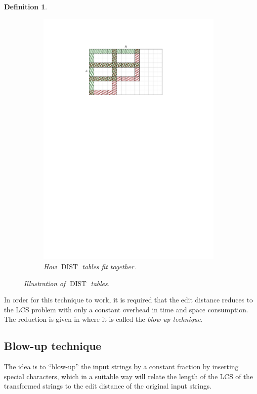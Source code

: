 \documentclass[twoside,11pt,openright]{report}
\newcommand{\DIST}{\operatorname{DIST}}
\newtheorem{mydef}{Definition}
\begin{document}
\begin{mydef}
\begin{figure}[h!]
\begin{subfigure}{0.45\textwidth}
      \includegraphics[width=\textwidth]{images/grid-dist-2}
      \caption{How $\DIST$ tables fit together.}
    \end{subfigure}
    \caption{Illustration of $\DIST$ tables.}
    \label{fig:defn-dist-table}
  \end{figure}
\end{mydef}

In order for this technique to work, it is required that the edit distance reduces to the LCS problem with only a constant overhead in time and space consumption. The reduction is given in \cite[p. 71]{DBLP:journals/corr/abs-0707-3619} where it is called the \textit{blow-up technique}.

\subsection{Blow-up technique}
The idea is to “blow-up” the input strings by a constant fraction by inserting special characters, which in a suitable way will relate the length of the LCS of the transformed strings to the edit distance of the original input strings.
\end{document}
